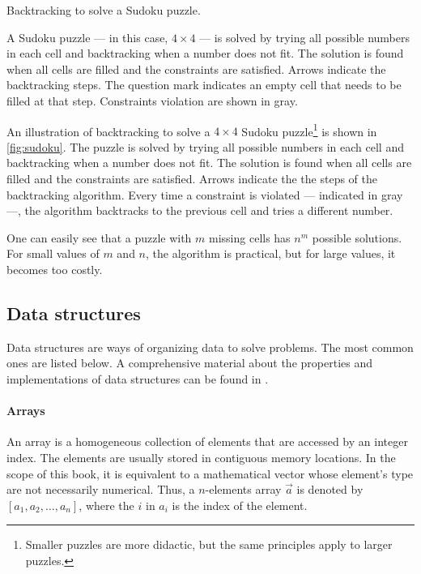 \begin{figurebox}[label=fig:sudoku]{Backtracking to solve a Sudoku puzzle.}
  \tcblower
  A Sudoku puzzle --- in this case, $4 \times 4$ --- is solved by trying all possible
  numbers in each cell and backtracking when a number does not fit.  The solution is found
  when all cells are filled and the constraints are satisfied.  Arrows indicate the
  backtracking steps.  The question mark indicates an empty cell that needs to be filled
  at that step.  Constraints violation are shown in gray.
\end{figurebox}

An illustration of backtracking to solve a $4 \times 4$ Sudoku puzzle\footnote{%
Smaller puzzles are more didactic, but the same principles apply to larger puzzles.}
is shown in \cref{fig:sudoku}.
The puzzle is solved by trying all possible numbers in each cell and backtracking when a
number does not fit.  The solution is found when all cells are filled and the constraints
are satisfied.  Arrows indicate the the steps of the backtracking algorithm.  Every time a
constraint is violated --- indicated in gray ---, the algorithm backtracks to the previous
cell and tries a different number.

One can easily see that a puzzle with $m$ missing cells has $n^m$ possible solutions.  For
small values of $m$ and $n$, the algorithm is practical, but for large values, it becomes
too costly.

\subsection{Data structures}

Data structures are ways of organizing data to solve problems.  The most common ones
are listed below.  A comprehensive material about the properties and implementations of
data structures can be found in \textcite{Cormen2022}.

\paragraph{Arrays}  An array is a homogeneous collection of elements that are accessed by
an integer index.  The elements are usually stored in contiguous memory locations.
In the scope of this book, it is equivalent to a mathematical vector whose element's type
are not necessarily numerical.  Thus, a $n$-elements array $\vec{a}$ is denoted by
$\left[a_1, a_2, \dots, a_n\right]$, where the $i$ in $a_i$ is the index of the element.

